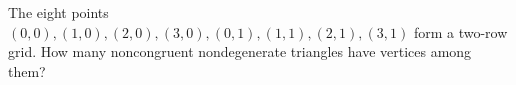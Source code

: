 The eight points $(0,0),(1,0),(2,0),(3,0),(0,1),(1,1),(2,1),(3,1)$ form a two-row grid. How many noncongruent nondegenerate triangles have vertices among them?

